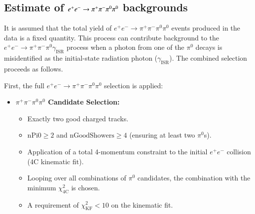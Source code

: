 

\clearpage
\subsection{Estimate of $e^+e^-\rightarrow\pi^+\pi^-\pi^{0}\pi^{0}$ backgrounds} 

It is assumed that the total yield of $e^{+}e^{-} \to \pi^{+}\pi^{-}\pi^{0}\pi^{0}$ events produced in the data is a fixed quantity. This process can contribute background to the $e^{+}e^{-} \to \pi^{+}\pi^{-}\pi^{0}\gamma_{\text{ISR}}$ process when a photon from one of the $\pi^{0}$ decays is misidentified as the initial-state radiation photon ($\gamma_{\text{ISR}}$). The combined selection proceeds as follows.

First, the full $e^{+}e^{-} \to \pi^{+}\pi^{-}\pi^{0}\pi^{0}$ selection is applied:

\begin{itemize}
    \item \textbf{$\pi^{+}\pi^{-}\pi^{0}\pi^{0}$ Candidate Selection:}
    \begin{itemize}
        \item Exactly two good charged tracks.
        \item $\text{nPi0} \geq 2$ and $\text{nGoodShowers} \geq 4$ (ensuring at least two $\pi^{0}$s).
        \item Application of a total 4-momentum constraint to the initial $e^{+}e^{-}$ collision (4C kinematic fit).
        \item Looping over all combinations of $\pi^0$ candidates, the combination with the minimum $\chi_{\mathrm{4C}}^2$ is chosen.
        \item A requirement of $\chi_{\mathrm{KF}}^{2} < 10$ on the kinematic fit.
    \end{itemize}
\end{itemize}

